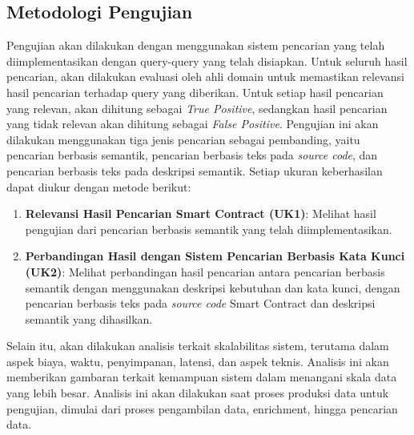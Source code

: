\subsection{Metodologi Pengujian}

Pengujian akan dilakukan dengan menggunakan sistem pencarian yang telah diimplementasikan dengan query-query yang telah disiapkan. Untuk seluruh hasil pencarian, akan dilakukan evaluasi oleh ahli domain untuk memastikan relevansi hasil pencarian terhadap query yang diberikan. Untuk setiap hasil pencarian yang relevan, akan dihitung sebagai \textit{True Positive}, sedangkan hasil pencarian yang tidak relevan akan dihitung sebagai \textit{False Positive}. Pengujian ini akan dilakukan menggunakan tiga jenis pencarian sebagai pembanding, yaitu pencarian berbasis semantik, pencarian berbasis teks pada \textit{source code}, dan pencarian berbasis teks pada deskripsi semantik. Setiap ukuran keberhasilan dapat diukur dengan metode berikut:

\begin{enumerate}
	\item \textbf{Relevansi Hasil Pencarian Smart Contract (UK1)}: Melihat hasil pengujian dari pencarian berbasis semantik yang telah diimplementasikan. 
	\item \textbf{Perbandingan Hasil dengan Sistem Pencarian Berbasis Kata Kunci (UK2)}: Melihat perbandingan hasil pencarian antara pencarian berbasis semantik dengan menggunakan deskripsi kebutuhan dan kata kunci, dengan pencarian berbasis teks pada \textit{source code} Smart Contract dan deskripsi semantik yang dihasilkan.
\end{enumerate}

Selain itu, akan dilakukan analisis terkait skalabilitas sistem, terutama dalam aspek biaya, waktu, penyimpanan, latensi, dan aspek teknis. Analisis ini akan memberikan gambaran terkait kemampuan sistem dalam menangani skala data yang lebih besar. Analisis ini akan dilakukan saat proses produksi data untuk pengujian, dimulai dari proses pengambilan data, enrichment, hingga pencarian data.
